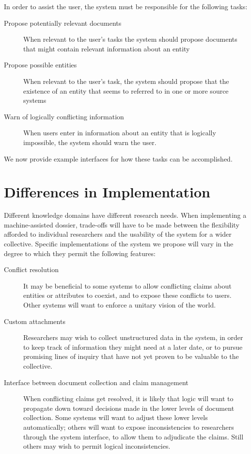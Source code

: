 \documentclass[format=siggraph, review=true]{acmart}
\begin{document}
In order to assist the user, the system must be responsible for the
following tasks:

\begin{description}
\item[Propose potentially relevant documents] When relevant to the
  user's tasks the system should propose documents that might
  contain relevant information about an entity
\item[Propose possible entities] When relevant to the user's task, the
  system should propose that the existence of an entity that seems to
  referred to in one or more source systems
\item[Warn of logically conflicting information] When users enter in
  information about an entity that is logically impossible, the system
  should warn the user.
\end{description}

We now provide example interfaces for how these tasks can be
accomplished.
  
\section{Differences in Implementation}

Different knowledge domains have different research needs. When
implementing a machine-assisted dossier, trade-offs will have to be made
between the flexibility afforded to individual researchers and the
usability of the system for a wider collective. Specific implementations
of the system we propose will vary in the degree to which they permit
the following features:

\begin{description}
  \item [Conflict resolution] It may be beneficial to some systems to
    allow conflicting claims about entities or attributes to coexist,
    and to expose these conflicts to users. Other systems will want
    to enforce a unitary vision of the world.

  \item [Custom attachments] Researchers may wish to collect unstructured
    data in the system, in order to keep track of information they might
    need at a later date, or to pursue promising lines of inquiry that
    have not yet proven to be valuable to the collective.

  \item [Interface between document collection and claim management] When
    conflicting claims get resolved, it is likely that logic will
    want to propagate down toward decisions made in the lower levels
    of document collection. Some systems will want to adjust these lower
    levels automatically; others will want to expose inconsistencies to
    researchers through the system interface, to allow them to adjudicate
    the claims. Still others may wish to permit logical inconsistencies.
\end{description}
\end{document}
